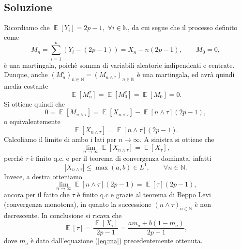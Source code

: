 \documentclass[
	12pt, %
]{fphw}
\DeclareMathOperator{\Ev}{\mathbb{E}}%
\begin{document}
\subsection*{Soluzione}
Ricordiamo che $\Ev[Y_i] = 2p-1,$ $\forall i \in \mathbb{N}$, da cui segue che il processo definito come
\begin{equation*}
    M_n = \sum_{i = 1}^n (Y_i - (2p-1))  = X_n - n(2p-1), \qquad M_0 = 0,
\end{equation*}
è una martingala, poichè somma di variabili aleatorie indipendenti e centrate.
Dunque, anche $(M_n^{\tau})_{n \in \mathbb{N}} = (M_{n \wedge \tau})_{n \in \mathbb{N}}$ è una martingala, ed avrà quindi media costante
\begin{equation*}
    \Ev[M_n^{\tau}] = \Ev[M_0^{\tau}] = \Ev[M_0] = 0.
\end{equation*}
Si ottiene quindi che
\begin{equation*}
    0 = \Ev[M_{n \wedge \tau}] = \Ev[X_{n \wedge \tau}] - \Ev[n \wedge \tau](2p-1),
\end{equation*}
o equivalentemente
\begin{equation*}
    \Ev[X_{n \wedge \tau}] = \Ev[n \wedge \tau](2p-1).
\end{equation*}
Calcoliamo il limite di ambo i lati per $n \to \infty$.
A sinistra si ottiene che
\begin{equation*}
    \lim_{n \to \infty} \Ev[X_{n \wedge \tau}] = \Ev[X_{\tau}],
\end{equation*}
perché $\tau$ è finito q.c. e per il teorema di convergenza dominata, infatti
\begin{equation*}
    |X_{n \wedge \tau}| \leq \max(a, b) \in L^1, \qquad \forall n \in \mathbb{N}.
\end{equation*}
Invece, a destra otteniamo
\begin{equation*}
    \lim_{n \to \infty} \Ev[n \wedge \tau](2p-1) = \Ev[\tau](2p-1),
\end{equation*}
ancora per il fatto che $\tau$ è finito q.c e grazie al teorema di Beppo Levi (convergenza monotona), in quanto la successione $(n \wedge \tau)_{n \in \mathbb{N}}$ è non decrescente.
In conclusione si ricava che
\begin{equation*}
        \Ev[\tau] = \frac{\Ev[X_{\tau}]}{2p - 1} = \frac{a m_a + b (1 - m_a)}{2p - 1},
\end{equation*}
dove $m_a$ è dato dall'equazione (\ref{eq:ma}) precedentemente ottenuta.
\end{document}
